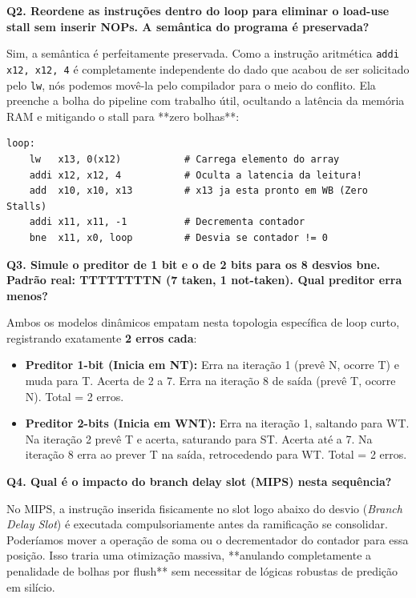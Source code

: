 \documentclass[12pt,a4paper]{article}
\begin{document}
\textbf{Q2. Reordene as instruções dentro do loop para eliminar o load-use stall sem inserir NOPs. A semântica do programa é preservada?}

Sim, a semântica é perfeitamente preservada. Como a instrução aritmética \texttt{addi x12, x12, 4} é completamente independente do dado que acabou de ser solicitado pelo \texttt{lw}, nós podemos movê-la pelo compilador para o meio do conflito. Ela preenche a bolha do pipeline com trabalho útil, ocultando a latência da memória RAM e mitigando o stall para **zero bolhas**:

\begin{lstlisting}[language={[RISC-V]Assembler}, caption=S2 Otimizado por Software]
loop:
    lw   x13, 0(x12)           # Carrega elemento do array
    addi x12, x12, 4           # Oculta a latencia da leitura!
    add  x10, x10, x13         # x13 ja esta pronto em WB (Zero Stalls)
    addi x11, x11, -1          # Decrementa contador
    bne  x11, x0, loop         # Desvia se contador != 0
\end{lstlisting}

\textbf{Q3. Simule o preditor de 1 bit e o de 2 bits para os 8 desvios bne. Padrão real: TTTTTTTTN (7 taken, 1 not-taken). Qual preditor erra menos?}

Ambos os modelos dinâmicos empatam nesta topologia específica de loop curto, registrando exatamente \textbf{2 erros cada}:
\begin{itemize}
    \item \textbf{Preditor 1-bit (Inicia em NT):} Erra na iteração 1 (prevê N, ocorre T) e muda para T. Acerta de 2 a 7. Erra na iteração 8 de saída (prevê T, ocorre N). Total = 2 erros.
    \item \textbf{Preditor 2-bits (Inicia em WNT):} Erra na iteração 1, saltando para WT. Na iteração 2 prevê T e acerta, saturando para ST. Acerta até a 7. Na iteração 8 erra ao prever T na saída, retrocedendo para WT. Total = 2 erros.
\end{itemize}

\textbf{Q4. Qual é o impacto do branch delay slot (MIPS) nesta sequência?}

No MIPS, a instrução inserida fisicamente no slot logo abaixo do desvio (\textit{Branch Delay Slot}) é executada compulsoriamente antes da ramificação se consolidar. Poderíamos mover a operação de soma ou o decrementador do contador para essa posição. Isso traria uma otimização massiva, **anulando completamente a penalidade de bolhas por flush** sem necessitar de lógicas robustas de predição em silício.
\end{document}
